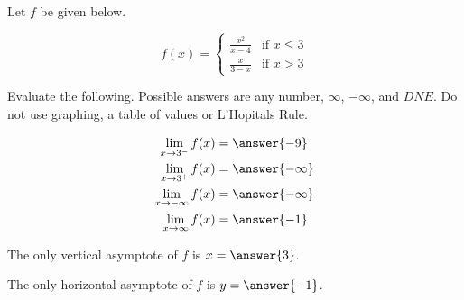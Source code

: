 \documentclass{ximera}
\author{Nela Lakos \and Kyle Parsons}
\begin{document}
\begin{exercise}

Let $f$ be given below.

\[
f(x) = 
\begin{cases}
\frac{x^2}{x-4} & \text{if } x\leq3\\
\frac{x}{3-x} & \text{if } x>3
\end{cases}
\]

Evaluate the following.  Possible answers are any number, $\infty$, $-\infty$, and $DNE$.  Do not use graphing, a table of values or L'Hopitals Rule.

\begin{align*}
\lim_{x\to3^-}f(x) &= \answer{-9}\\
\lim_{x\to3^+}f(x) &= \answer{-\infty}\\
\lim_{x\to-\infty}f(x) &= \answer{-\infty}\\
\lim_{x\to\infty}f(x) &= \answer{-1}
\end{align*}

\begin{exercise}

The only vertical asymptote of $f$ is $x=\answer{3}$.

\begin{exercise}

The only horizontal asymptote of $f$ is $y=\answer{-1}$.

\end{exercise}
\end{exercise}
\end{exercise}
\end{document}
